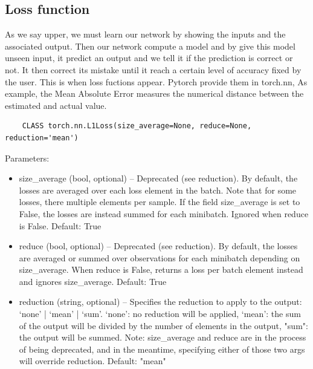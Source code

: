 \subsection{Loss function}
As we say upper, we must learn our network by showing the inputs and the associated output. Then our network compute a model and by give this model unseen input, it predict an output and we tell it if the prediction is correct or not. It then correct its mistake until it reach a certain level of accuracy fixed by the user. This is when loss fuctions appear. Pytorch provide them in torch.nn, As example, the Mean Absolute Error measures the numerical distance between the estimated and actual value. 
\begin{lstlisting}
    CLASS torch.nn.L1Loss(size_average=None, reduce=None, reduction='mean')
\end{lstlisting}


Parameters:	
\begin{itemize}
    \item size\_average (bool, optional) – Deprecated (see reduction). By default, the losses are averaged over each loss element in the batch. Note that for some losses, there multiple elements per sample. If the field size\_average is set to False, the losses are instead summed for each minibatch. Ignored when reduce is False. Default: True
    \item reduce (bool, optional) – Deprecated (see reduction). By default, the losses are averaged or summed over observations for each minibatch depending on size\_average. When reduce is False, returns a loss per batch element instead and ignores size\_average. Default: True
    \item reduction (string, optional) – Specifies the reduction to apply to the output: ‘none’ | ‘mean’ | ‘sum’. ‘none’: no reduction will be applied, ‘mean’: the sum of the output will be divided by the number of elements in the output, "sum": the output will be summed. Note: size\_average and reduce are in the process of being deprecated, and in the meantime, specifying either of those two args will override reduction. Default: "mean"
\end{itemize}


